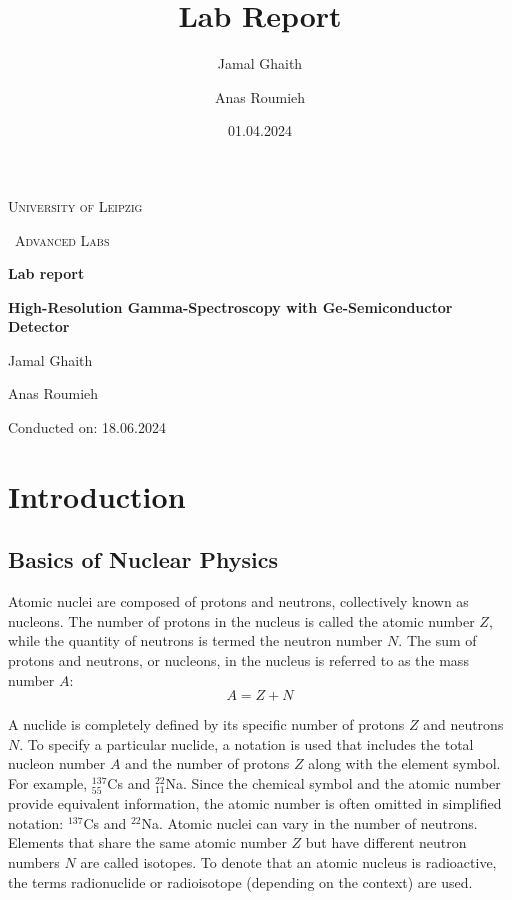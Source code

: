 \documentclass{article}
\title{Lab Report}
\author{Jamal Ghaith}
\author{Anas Roumieh}
\date{01.04.2024}
\begin{document}
\begin{titlepage}
	\centering
	{\scshape\LARGE University of Leipzig \par}
	\vspace{1cm}
	{\scshape\ Advanced Labs\par}
	\vspace{1.5cm}
	{\huge\bfseries Lab report\par}
	\vspace{2cm}
	{\huge\bfseries High-Resolution Gamma-Spectroscopy with Ge-Semiconductor Detector\par}
	\vspace{2cm}
	{\Large Jamal Ghaith\par}
    {\Large Anas Roumieh\par}
	\vfill

    {\Large Conducted on: 18.06.2024 \par}
	\vfill
\end{titlepage}


\tableofcontents
{}
\pagebreak{}

\section{Introduction}

\subsection{Basics of Nuclear Physics}
Atomic nuclei are composed of protons and neutrons, collectively known as nucleons. The number of protons in the nucleus is called the atomic number $Z$, while the quantity of neutrons is termed the neutron number $N$. The sum of protons and neutrons, or nucleons, in the nucleus is referred to as the mass number $A$: 
\begin{equation}
    A = Z + N
\end{equation}

A nuclide is completely defined by its specific number of protons $Z$ and neutrons $N$. To specify a particular nuclide, a notation is used that includes the total nucleon number $A$ and the number of protons $Z$ along with the element symbol. For example, $^{137} _{55}$Cs and $^{22}_{11}$Na. Since the chemical symbol and the atomic number provide equivalent information, the atomic number is often omitted in simplified notation: $^{137}$Cs and $^{22}$Na. Atomic nuclei can vary in the number of neutrons. Elements that share the same atomic number $Z$ but have different neutron numbers $N$ are called isotopes. To denote that an atomic nucleus is radioactive, the terms radionuclide or radioisotope (depending on the context) are used.
\end{document}
